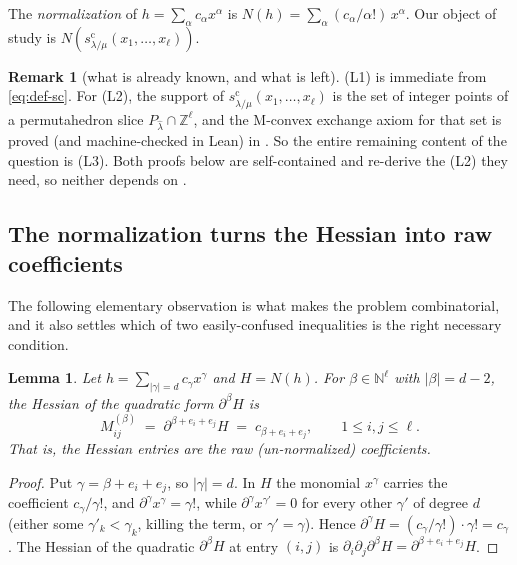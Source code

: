 \documentclass[11pt]{article}
\newtheorem{lemma}[theorem]{Lemma}
\theoremstyle{definition}
\newtheorem{remark}[theorem]{Remark}
\newcommand{\Z}{\mathbb{Z}}
\newcommand{\N}{\mathbb{N}}
\newcommand{\scy}{s^{\mathrm{c}}}
\begin{document}
The \emph{normalization} of $h=\sum_\alpha c_\alpha x^\alpha$ is
$N(h)=\sum_\alpha (c_\alpha/\alpha!)\,x^\alpha$. Our object of study is
$N(\scy_{\lambda/\mu}(x_1,\dots,x_\ell))$.

\begin{remark}[what is already known, and what is left]\label{rem:position}
(L1) is immediate from \eqref{eq:def-sc}. For (L2), the support of
$\scy_{\lambda/\mu}(x_1,\dots,x_\ell)$ is the set of integer points of a permutahedron slice
$P_{\hat\lambda}\cap\Z^\ell$, and the M-convex exchange axiom for that set is proved (and
machine-checked in Lean) in \cite{Clio0920}. So the entire remaining content of the question is
(L3). Both proofs below are self-contained and re-derive the (L2) they need, so neither depends
on \cite{Clio0920}.
\end{remark}

\subsection{The normalization turns the Hessian into raw coefficients}

The following elementary observation is what makes the problem combinatorial, and it also
settles which of two easily-confused inequalities is the right necessary condition.

\begin{lemma}\label{lem:raw}
Let $h=\sum_{|\gamma|=d}c_\gamma x^\gamma$ and $H=N(h)$. For $\beta\in\N^\ell$ with
$|\beta|=d-2$, the Hessian of the quadratic form $\partial^\beta H$ is
\begin{equation}\label{eq:raw}
  M^{(\beta)}_{ij}\;=\;\partial^{\beta+e_i+e_j}H\;=\;c_{\beta+e_i+e_j},
  \qquad 1\le i,j\le \ell .
\end{equation}
That is, the Hessian entries are the \emph{raw} (un-normalized) coefficients.
\end{lemma}

\begin{proof}
Put $\gamma=\beta+e_i+e_j$, so $|\gamma|=d$. In $H$ the monomial $x^\gamma$ carries the
coefficient $c_\gamma/\gamma!$, and $\partial^\gamma x^\gamma=\gamma!$, while
$\partial^\gamma x^{\gamma'}=0$ for every other $\gamma'$ of degree $d$ (either some
$\gamma'_k<\gamma_k$, killing the term, or $\gamma'=\gamma$). Hence
$\partial^{\gamma}H=(c_\gamma/\gamma!)\cdot\gamma!=c_\gamma$. The Hessian of the quadratic
$\partial^\beta H$ at entry $(i,j)$ is $\partial_i\partial_j\partial^\beta H
=\partial^{\beta+e_i+e_j}H$.
\end{proof}
\end{document}
